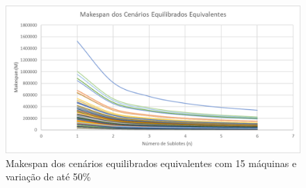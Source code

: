 \begin{figure}[!ht]
    \centering
    \includegraphics[width=12cm]{Resultados/Figuras/Meq15_50}
    \caption{Makespan dos cenários equilibrados equivalentes com 15 máquinas e variação de até 50\%}
    \label{fig:Meq15_50}
\end{figure}